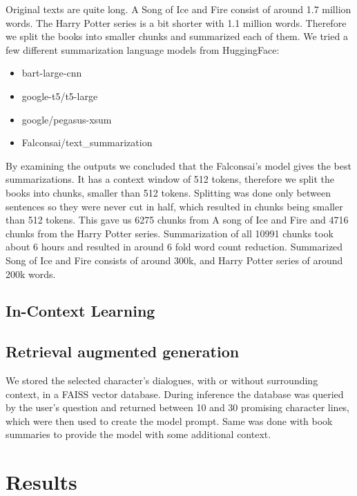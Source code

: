 \documentclass[fleqn,moreauthors,10pt]{ds_report}
\begin{document}
Original texts are quite long. A Song of Ice and Fire consist of around 1.7 million words. The Harry Potter series is a bit shorter with 1.1 million words. Therefore we split the books into smaller chunks and summarized each of them. We tried a few different summarization language models from HuggingFace:
\begin{itemize}
	\item bart-large-cnn
	\item google-t5/t5-large
	\item google/pegasus-xsum
	\item Falconsai/text\_summarization
\end{itemize}

By examining the outputs we concluded that the Falconsai's model gives the best summarizations.
It has a context window of 512 tokens, therefore we split the books into chunks, smaller than 512 tokens.
Splitting was done only between sentences so they were never cut in half, which resulted in chunks being smaller than 512 tokens.
This gave us 6275 chunks from A song of Ice and Fire and 4716 chunks from the Harry Potter series.
Summarization of all 10991 chunks took about 6 hours and resulted in around 6 fold word count reduction. Summarized Song of Ice and Fire consists of around 300k, and Harry Potter series of around 200k words.

\subsection{In-Context Learning}

\subsection*{Retrieval augmented generation}
We stored the selected character's dialogues, with or without surrounding context, in a FAISS vector database.
During inference the database was queried by the user's question and returned between 10 and 30 promising character lines,
which were then used to create the model prompt.
Same was done with book summaries to provide the model with some additional context.




\section*{Results}
\end{document}
